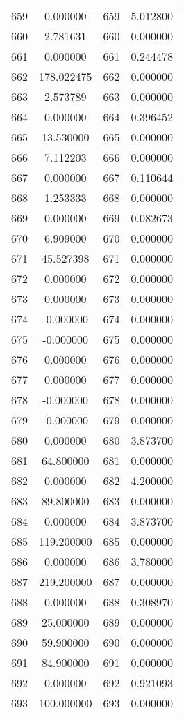 \documentclass[12pt]{article}
\begin{document}
\begin{longtable}{@{}cccc@{}}
659 & 0.000000 & 659 & 5.012800 \\
660 & 2.781631 & 660 & 0.000000 \\
661 & 0.000000 & 661 & 0.244478 \\
662 & 178.022475 & 662 & 0.000000 \\
663 & 2.573789 & 663 & 0.000000 \\
664 & 0.000000 & 664 & 0.396452 \\
665 & 13.530000 & 665 & 0.000000 \\
666 & 7.112203 & 666 & 0.000000 \\
667 & 0.000000 & 667 & 0.110644 \\
668 & 1.253333 & 668 & 0.000000 \\
669 & 0.000000 & 669 & 0.082673 \\
670 & 6.909000 & 670 & 0.000000 \\
671 & 45.527398 & 671 & 0.000000 \\
672 & 0.000000 & 672 & 0.000000 \\
673 & 0.000000 & 673 & 0.000000 \\
674 & -0.000000 & 674 & 0.000000 \\
675 & -0.000000 & 675 & 0.000000 \\
676 & 0.000000 & 676 & 0.000000 \\
677 & 0.000000 & 677 & 0.000000 \\
678 & -0.000000 & 678 & 0.000000 \\
679 & -0.000000 & 679 & 0.000000 \\
680 & 0.000000 & 680 & 3.873700 \\
681 & 64.800000 & 681 & 0.000000 \\
682 & 0.000000 & 682 & 4.200000 \\
683 & 89.800000 & 683 & 0.000000 \\
684 & 0.000000 & 684 & 3.873700 \\
685 & 119.200000 & 685 & 0.000000 \\
686 & 0.000000 & 686 & 3.780000 \\
687 & 219.200000 & 687 & 0.000000 \\
688 & 0.000000 & 688 & 0.308970 \\
689 & 25.000000 & 689 & 0.000000 \\
690 & 59.900000 & 690 & 0.000000 \\
691 & 84.900000 & 691 & 0.000000 \\
692 & 0.000000 & 692 & 0.921093 \\
693 & 100.000000 & 693 & 0.000000 \\

\end{longtable}
\end{document}
